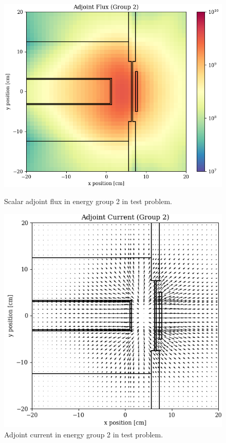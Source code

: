 \begin{figure}
  \begin{minipage}{0.49\linewidth}
    \centering
    \includegraphics[width=\linewidth]{content/testprob/scalar_flux_adj_g02.png}
    \caption{Scalar adjoint flux in energy group 2 in test problem.}
    \label{fig:tp:scalar_flux_adj_g02}
  \end{minipage}
  \hfill
  \begin{minipage}{0.49\linewidth}
    \centering
    \includegraphics[width=\linewidth]{content/testprob/current_adj_g02.png}
    \caption{Adjoint current in energy group 2 in test problem.}
    \label{fig:tp:current_adj_g02}
  \end{minipage}
\end{figure}

